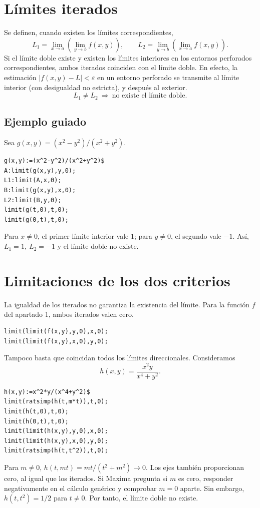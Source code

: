 \documentclass[12pt,a4paper]{article}
\begin{document}
\section{Límites iterados}
Se definen, cuando existen los límites correspondientes,
\[L_1=\lim_{x\to a}\left(\lim_{y\to b}f(x,y)\right),\qquad L_2=\lim_{y\to b}\left(\lim_{x\to a}f(x,y)\right).\]
Si el límite doble existe y existen los límites interiores en los entornos perforados correspondientes, ambos iterados coinciden con el límite doble. En efecto, la estimación $|f(x,y)-L|<\varepsilon$ en un entorno perforado se transmite al límite interior (con desigualdad no estricta), y después al exterior.
\[\boxed{L_1\ne L_2\ \Longrightarrow\ \text{no existe el límite doble}.}\]
\subsection*{Ejemplo guiado}
Sea $g(x,y)=(x^2-y^2)/(x^2+y^2)$.
\begin{lstlisting}
g(x,y):=(x^2-y^2)/(x^2+y^2)$
A:limit(g(x,y),y,0);
L1:limit(A,x,0);
B:limit(g(x,y),x,0);
L2:limit(B,y,0);
limit(g(t,0),t,0);
limit(g(0,t),t,0);
\end{lstlisting}
Para $x\ne0$, el primer límite interior vale $1$; para $y\ne0$, el segundo vale $-1$. Así, $\boxed{L_1=1,\ L_2=-1}$ y el límite doble no existe.
\section{Limitaciones de los dos criterios}
La igualdad de los iterados no garantiza la existencia del límite. Para la función $f$ del apartado 1, ambos iterados valen cero.
\begin{lstlisting}
limit(limit(f(x,y),y,0),x,0);
limit(limit(f(x,y),x,0),y,0);
\end{lstlisting}
Tampoco basta que coincidan todos los límites direccionales. Consideramos
\[h(x,y)=\frac{x^2y}{x^4+y^2}.\]
\begin{lstlisting}
h(x,y):=x^2*y/(x^4+y^2)$
limit(ratsimp(h(t,m*t)),t,0);
limit(h(t,0),t,0);
limit(h(0,t),t,0);
limit(limit(h(x,y),y,0),x,0);
limit(limit(h(x,y),x,0),y,0);
limit(ratsimp(h(t,t^2)),t,0);
\end{lstlisting}
Para $m\ne0$, $h(t,mt)=mt/(t^2+m^2)\to0$. Los ejes también proporcionan cero, al igual que los iterados. Si Maxima pregunta si $m$ es cero, responder negativamente en el cálculo genérico y comprobar $m=0$ aparte.
Sin embargo, $h(t,t^2)=1/2$ para $t\ne0$. Por tanto, el límite doble no existe.
\begin{center}
\end{center}
\end{document}
